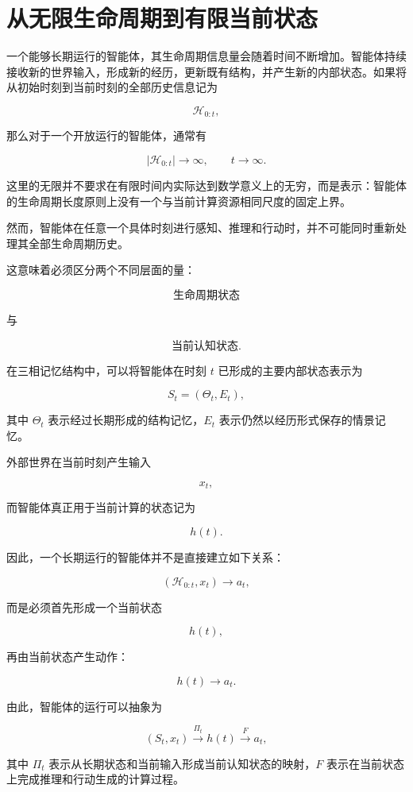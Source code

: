 \section{从无限生命周期到有限当前状态}

一个能够长期运行的智能体，其生命周期信息量会随着时间不断增加。智能体持续接收新的世界输入，形成新的经历，更新既有结构，并产生新的内部状态。如果将从初始时刻到当前时刻的全部历史信息记为

\[
\mathcal{H}_{0:t},
\]

那么对于一个开放运行的智能体，通常有

\[
|\mathcal{H}_{0:t}|
\rightarrow \infty,
\qquad
t\rightarrow\infty.
\]

这里的无限并不要求在有限时间内实际达到数学意义上的无穷，而是表示：智能体的生命周期长度原则上没有一个与当前计算资源相同尺度的固定上界。

然而，智能体在任意一个具体时刻进行感知、推理和行动时，并不可能同时重新处理其全部生命周期历史。

这意味着必须区分两个不同层面的量：

\[
\text{生命周期状态}
\]

与

\[
\text{当前认知状态}.
\]

在三相记忆结构中，可以将智能体在时刻 $t$ 已形成的主要内部状态表示为

\[
S_t
=
\left(
\Theta_t,
E_t
\right),
\]

其中 $\Theta_t$ 表示经过长期形成的结构记忆，$E_t$ 表示仍然以经历形式保存的情景记忆。

外部世界在当前时刻产生输入

\[
x_t,
\]

而智能体真正用于当前计算的状态记为

\[
h(t).
\]

因此，一个长期运行的智能体并不是直接建立如下关系：

\[
(\mathcal{H}_{0:t},x_t)
\rightarrow
a_t,
\]

而是必须首先形成一个当前状态

\[
h(t),
\]

再由当前状态产生动作：

\[
h(t)
\rightarrow
a_t.
\]

由此，智能体的运行可以抽象为

\[
(S_t,x_t)
\xrightarrow{\Pi_t}
h(t)
\xrightarrow{F}
a_t,
\]

其中 $\Pi_t$ 表示从长期状态和当前输入形成当前认知状态的映射，$F$ 表示在当前状态上完成推理和行动生成的计算过程。

